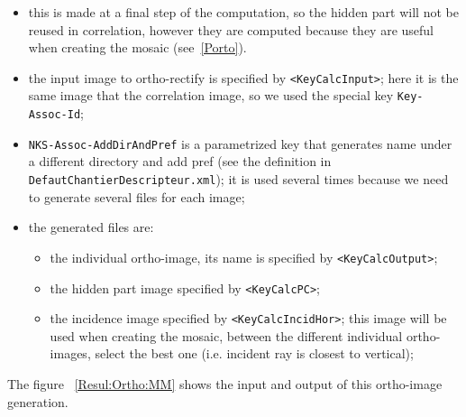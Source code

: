 \begin{itemize}
    \item  this is made at a final step of the computation, so the hidden part will not be reused in correlation,
           however they are computed because they are useful when creating the mosaic (see~\ref{Porto}).

    \item the input image to ortho-rectify is specified by {\tt <KeyCalcInput>}; here it is the same
          image that the correlation image, so we used the special key {\tt Key-Assoc-Id};

    \item {\tt NKS-Assoc-AddDirAndPref} is a parametrized key that generates name under a different directory
          and add pref (see the definition in {\tt DefautChantierDescripteur.xml}); it is used several times
          because we need to generate several files for each image;


    \item the generated files are:

    \begin{itemize}
            \item the individual ortho-image, its name is specified by {\tt <KeyCalcOutput>};
            \item the hidden part image specified by {\tt <KeyCalcPC>};
            \item the incidence image  specified by {\tt <KeyCalcIncidHor>}; this image will be used
                  when creating the mosaic, between the different individual ortho-images, select the best one
                  (i.e. incident ray is closest to vertical);
    \end{itemize}

\end{itemize}

The figure ~\ref{Resul:Ortho:MM} shows the input and output of this ortho-image generation.

